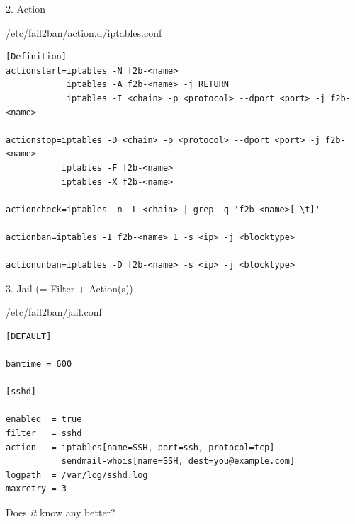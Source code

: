 \documentclass[]{beamer}
\begin{document}
\begin{frame}[fragile]{2. Action}

\begin{block}{/etc/fail2ban/action.d/iptables.conf}
{\scriptsize
\begin{verbatim}
[Definition]
actionstart=iptables -N f2b-<name>
            iptables -A f2b-<name> -j RETURN
            iptables -I <chain> -p <protocol> --dport <port> -j f2b-<name>

actionstop=iptables -D <chain> -p <protocol> --dport <port> -j f2b-<name>
           iptables -F f2b-<name>
           iptables -X f2b-<name>

actioncheck=iptables -n -L <chain> | grep -q 'f2b-<name>[ \t]'

actionban=iptables -I f2b-<name> 1 -s <ip> -j <blocktype>

actionunban=iptables -D f2b-<name> -s <ip> -j <blocktype>
\end{verbatim}
}
\end{block}
\end{frame}


\begin{frame}[fragile]{3. Jail (= Filter + Action(s))}

\begin{block}{/etc/fail2ban/jail.conf}
{\scriptsize
\begin{verbatim}
[DEFAULT]

bantime = 600

[sshd]

enabled  = true
filter   = sshd
action   = iptables[name=SSH, port=ssh, protocol=tcp]
           sendmail-whois[name=SSH, dest=you@example.com]
logpath  = /var/log/sshd.log
maxretry = 3
\end{verbatim}
}
\end{block}
\end{frame}


\begin{frame}{}
\begin{center}
\Large Does \emph{it} know any better?
\end{center}
\end{frame}
\end{document}
